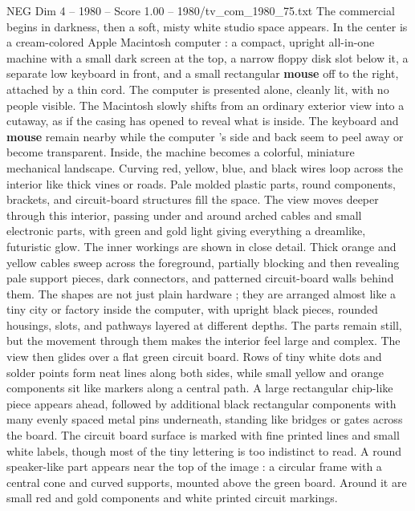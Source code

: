 \begin{textsample}{NEG Dim 4 – 1980 – Score 1.00 – 1980/tv\_com\_1980\_75.txt}  \label{ex:f4_neg_060}
The commercial begins in darkness, then a soft, misty white studio space appears.
In the center is a cream-colored Apple Macintosh computer : a compact, upright all-in-one machine with a small dark screen at the top, a narrow floppy disk slot below it, a separate low keyboard in front, and a small rectangular \textbf{mouse} off to the right, attached by a thin cord.
The computer is presented alone, cleanly lit, with no people visible.
The Macintosh slowly shifts from an ordinary exterior view into a cutaway, as if the casing has opened to reveal what is inside.
The keyboard and \textbf{mouse} remain nearby while the computer ’s side and back seem to peel away or become transparent.
Inside, the machine becomes a colorful, miniature mechanical landscape.
Curving red, yellow, blue, and black wires loop across the interior like thick vines or roads.
Pale molded plastic parts, round components, brackets, and circuit-board structures fill the space.
The view moves deeper through this interior, passing under and around arched cables and small electronic parts, with green and gold light giving everything a dreamlike, futuristic glow.
The inner workings are shown in close detail.
Thick orange and yellow cables sweep across the foreground, partially blocking and then revealing pale support pieces, dark connectors, and patterned circuit-board walls behind them.
The shapes are not just plain hardware ; they are arranged almost like a tiny city or factory inside the computer, with upright black pieces, rounded housings, slots, and pathways layered at different depths.
The parts remain still, but the movement through them makes the interior feel large and complex.
The view then glides over a flat green circuit board.
Rows of tiny white dots and solder points form neat lines along both sides, while small yellow and orange components sit like markers along a central path.
A large rectangular chip-like piece appears ahead, followed by additional black rectangular components with many evenly spaced metal pins underneath, standing like bridges or gates across the board.
The circuit board surface is marked with fine printed lines and small white labels, though most of the tiny lettering is too indistinct to read.
A round speaker-like part appears near the top of the image : a circular frame with a central cone and curved supports, mounted above the green board.
Around it are small red and gold components and white printed circuit markings.

\end{textsample}
